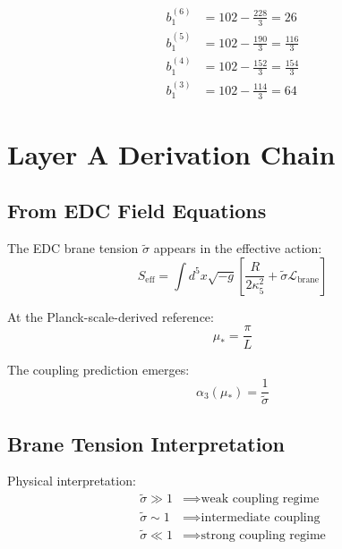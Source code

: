 \documentclass[11pt,a4paper]{article}
\theoremstyle{definition}
\begin{document}
\begin{align}
\label{eq:app-59}
b_1^{(6)} &= 102 - \frac{228}{3} = 26 \\
\label{eq:app-60}
b_1^{(5)} &= 102 - \frac{190}{3} = \frac{116}{3} \\
\label{eq:app-61}
b_1^{(4)} &= 102 - \frac{152}{3} = \frac{154}{3} \\
\label{eq:app-62}
b_1^{(3)} &= 102 - \frac{114}{3} = 64
\end{align}

\section{Layer A Derivation Chain}
\label{app:layer-a-chain}

\subsection{From EDC Field Equations}
\label{subsec:app-field-eqs}

The EDC brane tension $\tilde{\sigma}$ appears in the effective action:
\begin{equation}
\label{eq:app-63}
S_{\text{eff}} = \int d^5x \sqrt{-g}\left[\frac{R}{2\kappa_5^2} + \tilde{\sigma}\mathcal{L}_{\text{brane}}\right]
\end{equation}

At the Planck-scale-derived reference:
\begin{equation}
\label{eq:app-64}
\mu_* = \frac{\pi}{L}
\end{equation}

The coupling prediction emerges:
\begin{equation}
\label{eq:app-65}
\alpha_3(\mu_*) = \frac{1}{\tilde{\sigma}}
\end{equation}

\subsection{Brane Tension Interpretation}
\label{subsec:app-brane-interp}

Physical interpretation:
\begin{align}
\label{eq:app-66}
\tilde{\sigma} \gg 1 &\implies \text{weak coupling regime} \\
\label{eq:app-67}
\tilde{\sigma} \sim 1 &\implies \text{intermediate coupling} \\
\label{eq:app-68}
\tilde{\sigma} \ll 1 &\implies \text{strong coupling regime}
\end{align}
\end{document}
